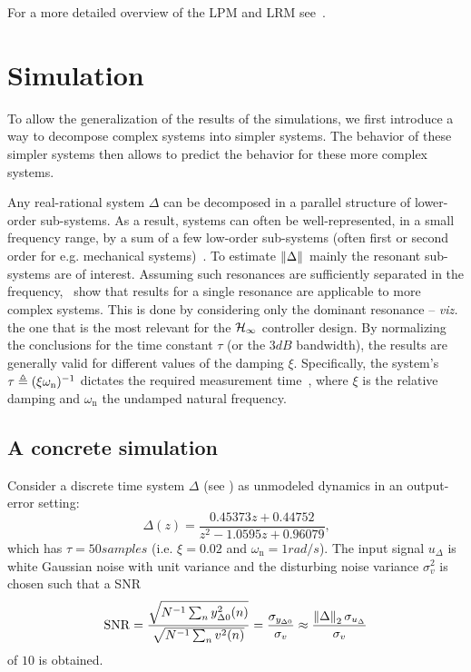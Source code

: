 For a more detailed overview of  the \gls{LPM} and \gls{LRM} see~\citep{Schoukens2009LPM,Pintelon2010LPM1,Pintelon2010LPM2,McKelvey2012LRM}.


\section{Simulation}
\label{sec:simulation}
To allow the generalization of the results of the simulations, we first introduce a way to decompose complex systems into simpler systems.
The behavior of these simpler systems then allows to predict the behavior for these more complex systems.


Any real-rational system $\Delta$ can be decomposed in a parallel structure of lower-order sub-systems.
As a result, systems can often be well-represented, in a small frequency range, by a sum of a few low-order sub-systems (often first or second order for e.g. mechanical systems)~\citep[Section 2.2.2]{Gawronski2004}.
To estimate $\left\| \Delta \right\|_{}$ mainly the resonant sub-systems are of interest.
Assuming such resonances are sufficiently separated in the frequency,~\citep{Schoukens2013LPMerror,Geerardyn2013TIM,Gawronski2004} show that results for a single resonance are applicable to more complex systems.
This is done by considering only the dominant resonance -- \emph{viz.} the one that is the most relevant for the $\mathcal{H}_{\infty}{}$ controller design.
By normalizing the conclusions for the time constant $\tau$ (or the $3\unit{dB}$ bandwidth), the results are generally valid for different values of the damping $\xi$.
Specifically, the system's $\tau \triangleq (\xi\omega_{\mathrm{n}})^{-1}$ dictates the required measurement time~\citep{Schoukens2013LPMerror}, where $\xi$ is the relative damping and $\omega_{\mathrm{n}}$ the undamped natural frequency.

\subsection{A concrete simulation}
Consider a discrete time system $\Delta$ (see ) as unmodeled dynamics in an output-error setting:
\begin{equation}
  \Delta(z) 
    =  \frac{0.45373 z + 0.44752}
            {z^2 - 1.0595 z + 0.96079}
  \label{eq:O2sysDT}
  \text{,}
\end{equation}
which has $\tau = 50 \unit{samples}$ (i.e. $\xi=0.02$ and $\omega_{\mathrm{n}} = 1 \unit{rad/s}$).
The input signal $u_{\Delta}$ is white Gaussian noise with unit variance and the disturbing noise variance $\sigma_v^2$ is chosen such that a \gls{SNR} 
\begin{equation}
  \SNR = \frac{\sqrt{\inv{N}\sum_n y_{\Delta0}^2(n) }}%
              {\sqrt{\inv{N}\sum_n v^2(n) }}
       = \frac{\sigma_{y_{\Delta0}}}{\sigma_v}
       \approx \frac{\norm[2]{\Delta} \sigma_{u_{\Delta}}}{\sigma_v}
  \label{eq:SNR}
\end{equation}
of $10$ is obtained.

